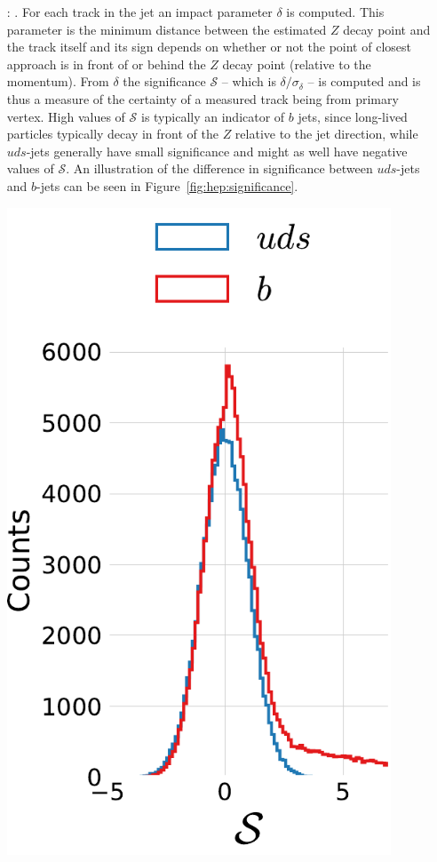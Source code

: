 \begin{enumerate}[leftmargin=*,labelindent=16pt]
  
  \item[\hspace{0.5cm} \code{projet}:] . For each track in the jet an impact parameter $\delta$ is computed. This parameter is the minimum distance between the estimated $Z$ decay point and the track itself and its sign depends on whether or not the point of closest approach is in front of or behind the $Z$ decay point (relative to the momentum). From $\delta$ the significance $\mathcal{S}$ -- which is $\delta / \sigma_\delta$ -- is computed and is thus a measure of the certainty of a measured track being from primary vertex. High values of $\mathcal{S}$ is typically an indicator of $b$ jets, since long-lived particles typically decay in front of the $Z$ relative to the jet direction, while $uds$-jets generally have small significance and might as well have negative values of $\mathcal{S}$. An illustration of the difference in significance between $uds$-jets and $b$-jets can be seen in Figure~\ref{fig:hep:significance}.
  \begin{marginfigure}[-0.5cm]
    \centerfloat
    \includegraphics[width=0.9\textwidth]{figures/projet_significance/projet_significance.pdf}

\end{marginfigure}
\end{enumerate}
